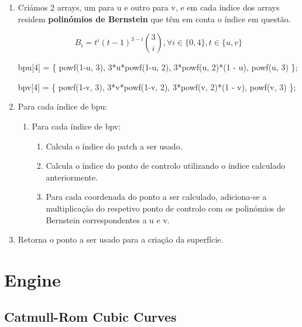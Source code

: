 \documentclass[a4paper]{article}
\begin{document}
\ttfamily
\begin{enumerate}
  \item Criámos 2 arrays, um para u e outro para v, e em cada índice dos arrays residem \textbf{polinómios de Bernstein} que têm em conta o índice em questão.
  \vspace{0.5cm}

  \hspace{0.0cm} $$B_{i} = t^i (t-1)^{3-i} \binom{3}{i}  , \forall i \in \{0,4\}, t \in \{u,v\}$$

  \vspace{0.5cm}

  \hspace{-2.8cm}bpu[4] = \{ powf(1-u, 3), 3*u*powf(1-u, 2), 3*powf(u, 2)*(1 - u), powf(u, 3) \};

  \vspace{0.5cm}

  \hspace{-2.8cm}bpv[4] = \{ powf(1-v, 3), 3*v*powf(1-v, 2), 3*powf(v, 2)*(1 - v), powf(v, 3) \};

  \vspace{0.5cm}

  \item Para cada índice de bpu:
  \begin{enumerate}
  	\item Para cada índice de bpv:
	\begin{enumerate}
		\item Calcula o índice do patch a ser usado.
		\item Calcula o índice do ponto de controlo utilizando o índice calculado anteriormente.
		\item Para cada coordenada do ponto a ser calculado, adiciona-se a multiplicação do respetivo ponto de controlo com os polinómios de Bernstein correspondentes a u e v.
	\end{enumerate}
  \end{enumerate}
  \item Retorna o ponto a ser usado para a criação da superfície.
\end{enumerate}
\rmfamily



\newpage

\section{Engine}
\label{sec:engine}

\subsection{Catmull-Rom Cubic Curves}
\label{sec:catmullrom}
\end{document}
